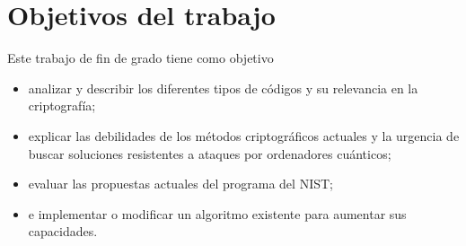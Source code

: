 \section{Objetivos del trabajo}

Este trabajo de fin de grado tiene como objetivo
\begin{itemize}
	\item analizar y describir los diferentes tipos de códigos y su relevancia en la criptografía;
	\item explicar las debilidades de los métodos criptográficos actuales y la urgencia de buscar soluciones resistentes a ataques por ordenadores cuánticos;
	\item evaluar las propuestas actuales del programa del NIST;
	\item e implementar o modificar un algoritmo existente para aumentar sus capacidades.
\end{itemize}
